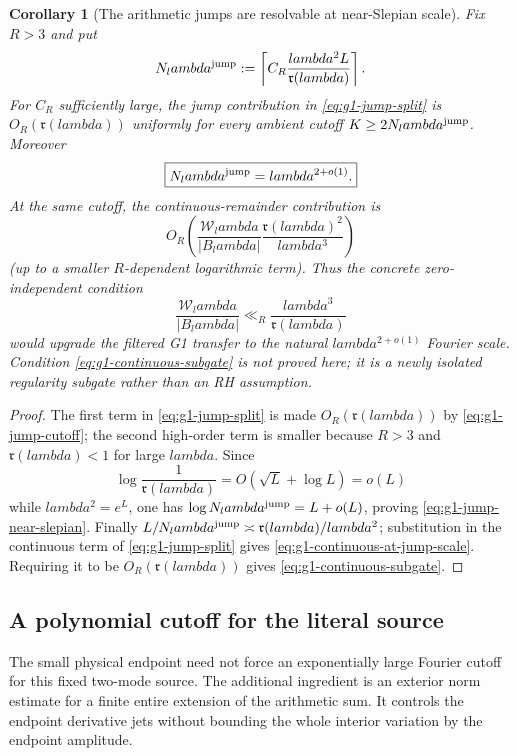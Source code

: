 \documentclass[11pt]{article}
\def\lambda{lambda}%
\newtheorem{corollary}[theorem]{Corollary}
\theoremstyle{remark}
\begin{document}
\begin{corollary}[The arithmetic jumps are resolvable at near-Slepian scale]\label{cor:g1-jump-natural-scale}
Fix $R>3$ and put
\begin{equation}\label{eq:g1-jump-cutoff}
 N_\lambda^{\rm jump}
 :=\left\lceil
 C_R\frac{\lambda^2L}{\mathfrak r(\lambda)}
 \right\rceil.
\end{equation}
For $C_R$ sufficiently large, the jump contribution in
\eqref{eq:g1-jump-split} is $O_R(\mathfrak r(\lambda))$ uniformly for every
ambient cutoff $K\ge2N_\lambda^{\rm jump}$.  Moreover
\begin{equation}\label{eq:g1-jump-near-slepian}
 \boxed{
 N_\lambda^{\rm jump}=\lambda^{2+o(1)}.}
\end{equation}
At the same cutoff, the continuous-remainder contribution is
\begin{equation}\label{eq:g1-continuous-at-jump-scale}
 O_R\!\left(
 \frac{\mathcal W_\lambda}{|B_\lambda|}
 \frac{\mathfrak r(\lambda)^2}{\lambda^3}
 \right)
\end{equation}
(up to a smaller $R$-dependent logarithmic term).  Thus the concrete
zero-independent condition
\begin{equation}\label{eq:g1-continuous-subgate}
 \boxed{
 \frac{\mathcal W_\lambda}{|B_\lambda|}
 \ll_R\frac{\lambda^3}{\mathfrak r(\lambda)} }
\end{equation}
would upgrade the filtered G1 transfer to the natural
$\lambda^{2+o(1)}$ Fourier scale.  Condition
\eqref{eq:g1-continuous-subgate} is \emph{not} proved here; it is a newly
isolated regularity subgate rather than an RH assumption.
\end{corollary}
\begin{proof}
The first term in \eqref{eq:g1-jump-split} is made
$O_R(\mathfrak r(\lambda))$ by \eqref{eq:g1-jump-cutoff}; the second
high-order term is smaller because $R>3$ and $\mathfrak r(\lambda)<1$ for
large $\lambda$.  Since
\[
 \log\frac1{\mathfrak r(\lambda)}=O(\sqrt L+\log L)=o(L)
\]
while $\lambda^2=e^L$, one has
$\log N_\lambda^{\rm jump}=L+o(L)$, proving
\eqref{eq:g1-jump-near-slepian}.  Finally
$L/N_\lambda^{\rm jump}\asymp
\mathfrak r(\lambda)/\lambda^2$; substitution in the continuous term of
\eqref{eq:g1-jump-split} gives
\eqref{eq:g1-continuous-at-jump-scale}.  Requiring it to be
$O_R(\mathfrak r(\lambda))$ gives
\eqref{eq:g1-continuous-subgate}.
\end{proof}


\subsection{A polynomial cutoff for the literal source}
The small physical endpoint need not force an exponentially large Fourier
cutoff for this fixed two-mode source.  The additional ingredient is an
exterior norm estimate for a finite entire extension of the arithmetic
sum.  It controls the endpoint derivative jets without bounding the whole
interior variation by the endpoint amplitude.
\end{document}
